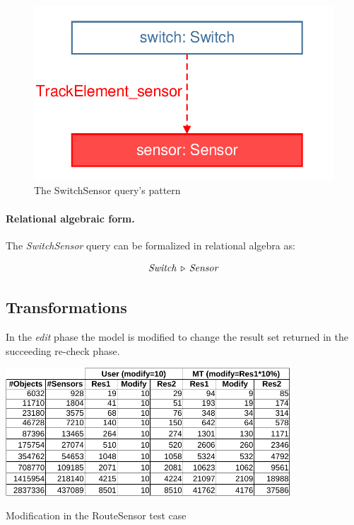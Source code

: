 \begin{figure}[Htb]
		\centering
		\includegraphics[scale=0.4]{figures/trainbenchmark-switchsensor}
		\caption{The SwitchSensor query's pattern}
		\label{fig:trainbenchmark-switchsensor}
\end{figure}

\paragraph{Relational algebraic form.} The \textit{SwitchSensor} query can be formalized in relational algebra as:

$$ \mathit{Switch} \, \triangleright \, \mathit{Sensor} $$


\subsection{Transformations}
\label{sec:transformatios}

In the \emph{edit} phase the model is modified to change the result set returned in the succeeding re-check phase.


\begin{table}[Htb]
\centering
\includegraphics[width=0.8\textwidth]{figures/instance/instance_characteristics_fig-crop.pdf}
\caption{Modification in the RouteSensor test case}
\label{table:modify_RouteSensor}
\end{table}

